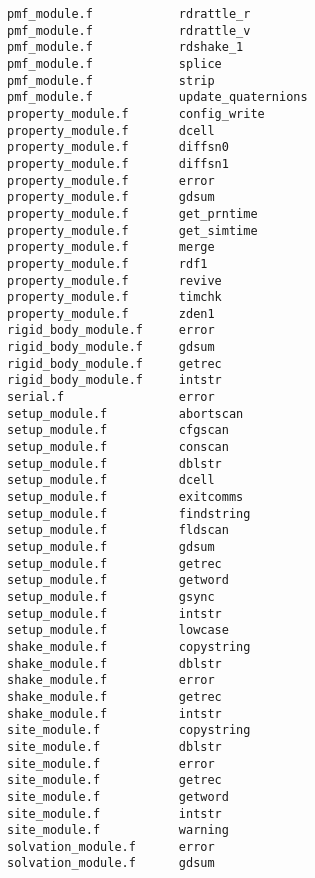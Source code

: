 \begin{verbatim}
pmf_module.f            rdrattle_r                
pmf_module.f            rdrattle_v                
pmf_module.f            rdshake_1                 
pmf_module.f            splice                
pmf_module.f            strip                 
pmf_module.f            update_quaternions        
property_module.f       config_write              
property_module.f       dcell                     
property_module.f       diffsn0                   
property_module.f       diffsn1                   
property_module.f       error                     
property_module.f       gdsum                     
property_module.f       get_prntime               
property_module.f       get_simtime               
property_module.f       merge                     
property_module.f       rdf1                      
property_module.f       revive                    
property_module.f       timchk                    
property_module.f       zden1                     
rigid_body_module.f     error                     
rigid_body_module.f     gdsum                     
rigid_body_module.f     getrec                    
rigid_body_module.f     intstr                    
serial.f                error                     
setup_module.f          abortscan                 
setup_module.f          cfgscan                   
setup_module.f          conscan                   
setup_module.f          dblstr                    
setup_module.f          dcell                     
setup_module.f          exitcomms                 
setup_module.f          findstring            
setup_module.f          fldscan               
setup_module.f          gdsum                     
setup_module.f          getrec                    
setup_module.f          getword                   
setup_module.f          gsync                     
setup_module.f          intstr                    
setup_module.f          lowcase                   
shake_module.f          copystring                
shake_module.f          dblstr                    
shake_module.f          error                     
shake_module.f          getrec                    
shake_module.f          intstr                    
site_module.f           copystring                
site_module.f           dblstr                    
site_module.f           error                     
site_module.f           getrec                    
site_module.f           getword                   
site_module.f           intstr                    
site_module.f           warning                   
solvation_module.f      error                     
solvation_module.f      gdsum                     

\end{verbatim}
